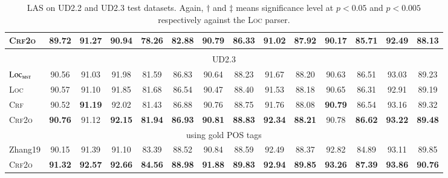 \begin{table*}[tb]
\begin{tabular}{lccccccccccccc}
\textsc{Crf2o} & \textbf{89.72} & \textbf{91.27} & \textbf{90.94}  & \textbf{78.26} & \textbf{82.88} & \textbf{90.79} & \textbf{86.33} & \textbf{91.02} & \textbf{87.92} & \textbf{90.17} & \textbf{85.71} & \textbf{92.49} & \textbf{88.13} \\
\hline
\\[-9pt]
\multicolumn{14}{c}{UD2.3} \\[1pt]
$\textsc{Loc}_{\textsc{mst}}$   &         90.56  &         91.03  &         91.98  &         81.59  & 86.83 &         90.64  & 88.23 &         91.67  &         88.20  &         90.63  & 86.51 & 93.03 &         89.23 \\
\textsc{Loc}                    &         90.57  &         91.10  &         91.85  &         81.68  & 86.54 &         90.47  & 88.40 &         91.53  &         88.18  &         90.65  & 86.31 & 92.91 &         89.19 \\
\textsc{Crf}   &         90.52  & \textbf{91.19} &         92.02  &         81.43  &         86.88\rlap{$^\dagger$}  &         90.76\rlap{$^\dagger$}  &         88.75  &         91.76  &         88.08  & \textbf{90.79} & 86.54 & 93.16\rlap{$^\ddagger$} &         89.32\rlap{$^\ddagger$} \\
\textsc{Crf2o} & \textbf{90.76} &         91.12  & \textbf{92.15}\rlap{$^\ddagger$} & \textbf{81.94} & \textbf{86.93}\rlap{$^\dagger$} & \textbf{90.81}\rlap{$^\ddagger$} &         \textbf{88.83}\rlap{$^\dagger$}  & \textbf{92.34}\rlap{$^\ddagger$} & \textbf{88.21}\rlap{$^\dagger$} & 90.78 & \textbf{86.62} & \textbf{93.22}\rlap{$^\ddagger$} & \textbf{89.48}\rlap{$^\ddagger$} \\
\multicolumn{14}{c}{using gold POS tags} \\[1pt]
Zhang19        & 90.15 & 91.39 & 91.10 & 83.39 & 88.52 & 90.84 & 88.59 & 92.49 & 88.37 & 92.82 & 84.89 & 93.11 & 89.85 \\
\textsc{Crf2o} & \textbf{91.32} & \textbf{92.57} & \textbf{92.66} & \textbf{84.56} & \textbf{88.98} & \textbf{91.88} & \textbf{89.83} & \textbf{92.94} & \textbf{89.85} & \textbf{93.26} & \textbf{87.39} & \textbf{93.86} & \textbf{90.76} \\
\bottomrule
\end{tabular}
\caption{LAS on UD2.2 and UD2.3 test datasets.
Again, $\dagger$ and $\ddagger$ means significance level at $p<0.05$ and $p<0.005$ respectively against the \textsc{Loc} parser. }
\label{table:ud2.3-test}
\end{table*}


